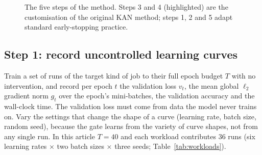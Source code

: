 \begin{figure}[t]
\centering
{}
\caption{The five steps of the method. Steps 3 and 4 (highlighted) are the customisation of the original KAN method; steps 1, 2 and 5 adapt standard early-stopping practice.}
\label{fig:overview}
\end{figure}

\subsection*{Step 1: record uncontrolled learning curves}
Train a set of runs of the target kind of job to their full epoch budget $T$ with no intervention, and record per epoch $t$ the validation loss $v_t$, the mean global $\ell_2$ gradient norm $g_t$ over the epoch's mini-batches, the validation accuracy and the wall-clock time. The validation loss must come from data the model never trains on. Vary the settings that change the shape of a curve (learning rate, batch size, random seed), because the gate learns from the variety of curve shapes, not from any single run. In this article $T=40$ and each workload contributes 36 runs (six learning rates $\times$ two batch sizes $\times$ three seeds; Table~\ref{tab:workloads}).

